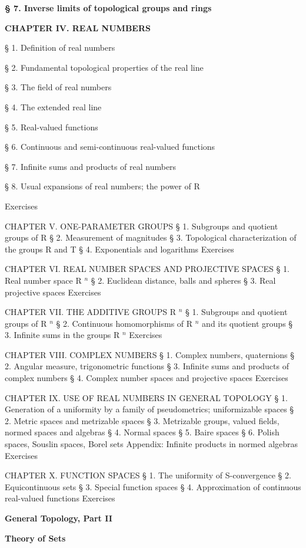 \textbf{§ 7. Inverse limits of topological groups and rings}

\textbf{CHAPTER IV. REAL NUMBERS}

§ 1. Definition of real numbers

§ 2. Fundamental topological properties of the real line

§ 3. The field of real numbers

§ 4. The extended real line

§ 5. Real-valued functions

§ 6. Continuous and semi-continuous real-valued functions

§ 7. Infinite sums and products of real numbers

§ 8. Usual expansions of real numbers; the power of R

Exercises

CHAPTER V. ONE-PARAMETER GROUPS § 1. Subgroups and quotient groups of R § 2. Measurement of magnitudes § 3. Topological characterization of the groups R and T § 4. Exponentials and logarithms Exercises

CHAPTER VI. REAL NUMBER SPACES AND PROJECTIVE SPACES § 1. Real number space R \(^{n}\) § 2. Euclidean distance, balls and spheres § 3. Real projective spaces Exercises

CHAPTER VII. THE ADDITIVE GROUPS R \(^{n}\) § 1. Subgroups and quotient groups of R \(^{n}\) § 2. Continuous homomorphisms of R \(^{n}\) and its quotient groups § 3. Infinite sums in the groups R \(^{n}\) Exercises

CHAPTER VIII. COMPLEX NUMBERS § 1. Complex numbers, quaternions § 2. Angular measure, trigonometric functions § 3. Infinite sums and products of complex numbers § 4. Complex number spaces and projective spaces Exercises

CHAPTER IX. USE OF REAL NUMBERS IN GENERAL TOPOLOGY § 1. Generation of a uniformity by a family of pseudometrics; uniformizable spaces § 2. Metric spaces and metrizable spaces § 3. Metrizable groups, valued fields, normed spaces and algebras § 4. Normal spaces § 5. Baire spaces § 6. Polish spaces, Souslin spaces, Borel sets Appendix: Infinite products in normed algebras Exercises

CHAPTER X. FUNCTION SPACES § 1. The uniformity of S-convergence § 2. Equicontinuous sets § 3. Special function spaces § 4. Approximation of continuous real-valued functions Exercises

\textbf{General Topology, Part II}

\textbf{Theory of Sets}

